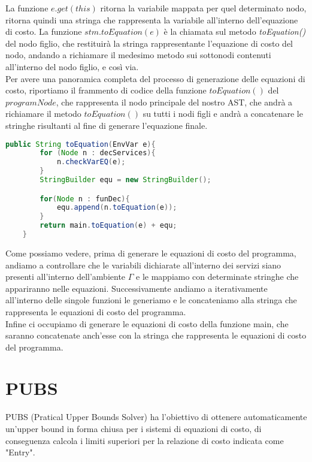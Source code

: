 \documentclass[../../main.tex]{subfiles}
\begin{document}
La funzione $e.get(this)$ ritorna la variabile mappata per quel determinato nodo, ritorna quindi una stringa che rappresenta la variabile all'interno dell'equazione di costo. La funzione $stm.toEquation(e)$ è la chiamata sul metodo \textit{toEquation()} del nodo figlio, che restituirà la stringa rappresentante l'equazione di costo del nodo, andando a richiamare il medesimo metodo sui sottonodi contenuti all'interno del nodo figlio, e così via.\\
Per avere una panoramica completa del processo di generazione delle equazioni di costo, riportiamo il frammento di codice della funzione $toEquation()$ del $programNode$, che rappresenta il nodo principale del nostro AST, che andrà a richiamare il metodo $toEquation()$ su tutti i nodi figli e andrà a concatenare le stringhe risultanti al fine di generare l'equazione finale.
\begin{lstlisting}[language=Java, caption={toEquation() del ProgramNode}]
    public String toEquation(EnvVar e){
        for (Node n : decServices){
            n.checkVarEQ(e);
        }
        StringBuilder equ = new StringBuilder();

        for(Node n : funDec){
            equ.append(n.toEquation(e));
        }
        return main.toEquation(e) + equ;
    }
\end{lstlisting}

Come possiamo vedere, prima di generare le equazioni di costo del programma, andiamo a controllare che le variabili dichiarate all'interno dei servizi siano presenti all'interno dell'ambiente $\varGamma$ e le mappiamo con determinate stringhe che appariranno nelle equazioni. Successivamente andiamo a iterativamente all'interno delle singole funzioni le generiamo e le concateniamo alla stringa che rappresenta le equazioni di costo del programma.\\
Infine ci occupiamo di generare le equazioni di costo della funzione main, che saranno concatenate anch'esse con la stringa che rappresenta le equazioni di costo del programma.

\section{PUBS}
\label{sec:pubs}
PUBS (Pratical Upper Bounds Solver) ha l'obiettivo di ottenere automaticamente un'upper bound in forma chiusa per i sistemi di equazioni di costo, di conseguenza calcola i limiti superiori per la relazione di costo indicata come "Entry".
\end{document}
